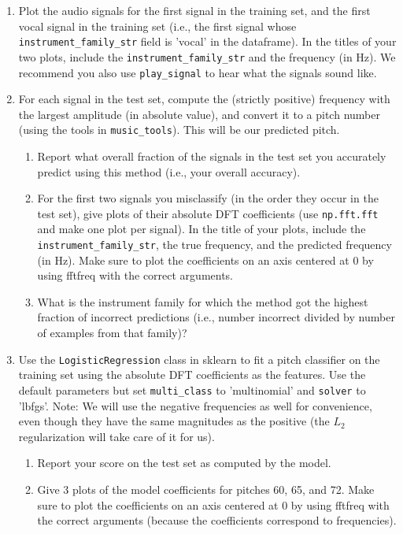 \documentclass[12pt,twoside]{article}
\begin{document}
\begin{enumerate}
  \begin{enumerate}
  \item Plot the audio signals for the first signal in the training
    set, and the first vocal signal in the training set (i.e., the
    first signal whose \texttt{instrument\_family\_str} field is
    'vocal' in the dataframe).  In the titles of your two plots, include the
    \texttt{instrument\_family\_str} and the frequency (in Hz).
    We recommend you also use \texttt{play\_signal}
    to hear what the signals sound like.
  \item For each signal in the test set, compute the (strictly positive)
    frequency with the largest amplitude (in absolute value), and
    convert it to a pitch number (using the tools in
    \texttt{music\_tools}).  This will be our predicted pitch.
    \begin{enumerate}
    \item Report what overall fraction of the signals in
      the test set you accurately predict using this method (i.e.,
      your overall accuracy).
    \item For the
      first two signals you misclassify (in the order they occur in the
      test set), give plots of their absolute
      DFT coefficients (use \texttt{np.fft.fft} and make one plot per
      signal). In the title of your plots, include the
      \texttt{instrument\_family\_str}, the true frequency, and the
      predicted frequency (in Hz).  Make
      sure to plot the coefficients on an axis centered at $0$ by using
      fftfreq with the correct arguments.
    \item What is the instrument family for which the method got the
      highest fraction of incorrect predictions (i.e., number incorrect
      divided by number of examples from that family)?
    \end{enumerate}
  \item Use the \texttt{LogisticRegression} class in sklearn to fit a
    pitch classifier on the training set using the absolute DFT
    coefficients as the features.  Use the default parameters
    but set \texttt{multi\_class} to 'multinomial' and
    \texttt{solver} to 'lbfgs'.  Note: We will use the negative
    frequencies as well for convenience, even though they have the same magnitudes as
    the positive (the $L_2$ regularization will take care of it for us).
    \begin{enumerate}
    \item Report your score on the test set as computed by the model.
    \item Give 3 plots of the model coefficients for pitches 60, 65, and 72.
      Make sure to plot the coefficients on an axis centered at $0$ by using
      fftfreq with the correct arguments (because the coefficients
      correspond to frequencies).
    \end{enumerate}
  \end{enumerate}

 \end{enumerate}
\end{document}
